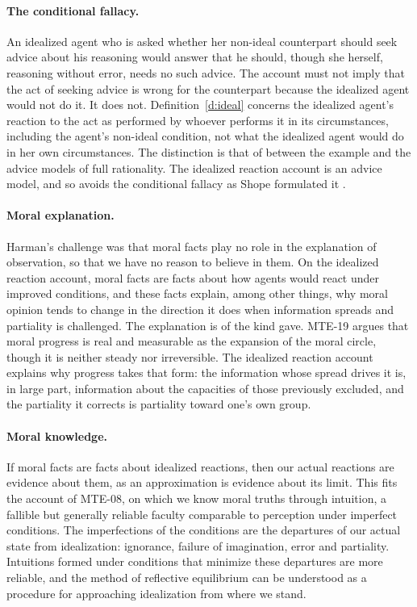\documentclass{situationist-preprint}
\begin{document}
\paragraph{The conditional fallacy.} An idealized agent who is asked whether her non-ideal counterpart should seek advice about his reasoning would answer that he should, though she herself, reasoning without error, needs no such advice. The account must not imply that the act of seeking advice is wrong for the counterpart because the idealized agent would not do it. It does not. Definition~\ref{d:ideal} concerns the idealized agent's reaction to the act as performed by whoever performs it in its circumstances, including the agent's non-ideal condition, not what the idealized agent would do in her own circumstances. The distinction is that of \citet{Smith1994} between the example and the advice models of full rationality. The idealized reaction account is an advice model, and so avoids the conditional fallacy as Shope formulated it \citep{Shope1978}.

\paragraph{Moral explanation.} Harman's challenge was that moral facts play no role in the explanation of observation, so that we have no reason to believe in them. On the idealized reaction account, moral facts are facts about how agents would react under improved conditions, and these facts explain, among other things, why moral opinion tends to change in the direction it does when information spreads and partiality is challenged. The explanation is of the kind \citet{Sturgeon1985} gave. MTE-19 argues that moral progress is real and measurable as the expansion of the moral circle, though it is neither steady nor irreversible. The idealized reaction account explains why progress takes that form: the information whose spread drives it is, in large part, information about the capacities of those previously excluded, and the partiality it corrects is partiality toward one's own group.

\paragraph{Moral knowledge.} If moral facts are facts about idealized reactions, then our actual reactions are evidence about them, as an approximation is evidence about its limit. This fits the account of MTE-08, on which we know moral truths through intuition, a fallible but generally reliable faculty comparable to perception under imperfect conditions. The imperfections of the conditions are the departures of our actual state from idealization: ignorance, failure of imagination, error and partiality. Intuitions formed under conditions that minimize these departures are more reliable, and the method of reflective equilibrium can be understood as a procedure for approaching idealization from where we stand.
\end{document}
